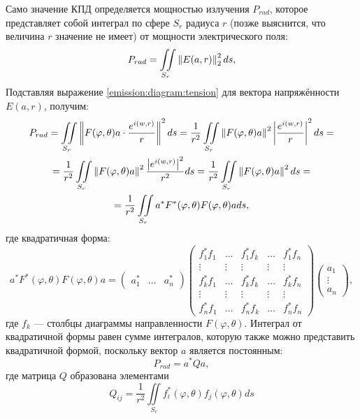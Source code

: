 Само значение КПД определяется мощностью излучения $P_{rad}$, которое представляет собой интеграл по сфере $S_r$ радиуса $r$ (позже выяснится,
что величина $r$ значение не имеет) от мощности электрического поля:
\[
    P_{rad}
    = \iint \limits_{S_r} \left \| E(a, r) \right \|_2^2 ds ,
\]
Подставляя выражение \eqref{emission:diagram:tension} для вектора напряжённости $E(a, r)$, получим:
\begin{multline*}
    P_{rad}
    = \iint \limits_{S_r} \left \| F(\varphi, \theta) a \cdot \frac{e^{i \left ( w, r \right )}}{r} \right \|^2 ds
    = \frac{1}{r^2} \iint \limits_{S_r} \left \| F(\varphi, \theta) a \right \|^2 \left | \frac{e^{i \left ( w, r \right )}}{r} \right |^2 ds = \\
    = \frac{1}{r^2} \iint \limits_{S_r} \left \| F(\varphi, \theta) a \right \|^2 \frac{\left | e^{i \left ( w, r \right )} \right |^2}{r^2} ds
    = \frac{1}{r^2} \iint \limits_{S_r} \left \| F(\varphi, \theta) a \right \|^2 ds = \\
    = \frac{1}{r^2} \iint \limits_{S_r} a^* F^*(\varphi, \theta) F(\varphi, \theta) a ds ,
\end{multline*}
где квадратичная форма:
\[
    a^* F^*(\varphi, \theta) F(\varphi, \theta) a
    = \begin{pmatrix}
        a_1^* & \dots & a_n^*
    \end{pmatrix}
    \begin{pmatrix}
        f_1^* f_1 & \dots  & f_1^* f_k & \dots  & f_1^* f_n \\
        \vdots    & \vdots & \vdots    & \vdots & \vdots    \\
        f_k^* f_1 & \dots  & f_k^* f_k & \dots  & f_k^* f_n \\
        \vdots    & \vdots & \vdots    & \vdots & \vdots    \\
        f_n^* f_1 & \dots  & f_n^* f_k & \dots  & f_n^* f_n
    \end{pmatrix}
    \begin{pmatrix}
        a_1    \\
        \vdots \\
        a_n
    \end{pmatrix}
    ,
\]
где $f_k$ --- столбцы диаграммы направленности $F(\varphi, \theta)$. Интеграл от квадратичной формы равен сумме интегралов, которую также можно
представить квадратичной формой, поскольку вектор $a$ является постоянным:
\[
    P_{rad}
    = a^* Q a,
\]
где матрица $Q$ образована элементами
\[
    Q_{ij}
    = \frac{1}{r^2} \iint \limits_{S_r} f_i^*(\varphi, \theta) f_j(\varphi, \theta) ds
\]

